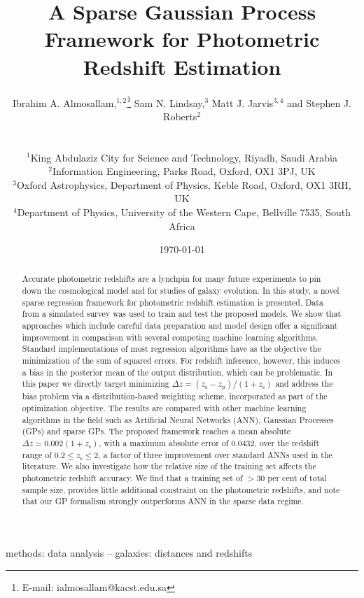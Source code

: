 \documentclass[useAMS,usenatbib,fleqn]{mn2e}
\title[A Sparse GP Framework for Photometric Redshift]{A Sparse Gaussian Process Framework for Photometric Redshift Estimation}
\author[Almosallam et al.]
{\parbox{\textwidth}{Ibrahim A. Almosallam,$^{1,2}$\thanks{E-mail: ialmosallam@kacst.edu.sa} Sam N. Lindsay,$^{3}$ Matt J. Jarvis$^{3,4}$ and Stephen J. Roberts$^{2}$
}
\vspace{0.4cm}\\
\parbox{\textwidth}{
$^1$King Abdulaziz City for Science and Technology, Riyadh, Saudi Arabia\\
$^2$Information Engineering, Parks Road, Oxford, OX1 3PJ, UK\\
$^3$Oxford Astrophysics, Department of Physics, Keble Road, Oxford, OX1 3RH, UK\\
$^4$Department of Physics, University of the Western Cape, Bellville 7535, South Africa\\
}}
\begin{document}
\date{\today}

\pagerange{\pageref{firstpage}--\pageref{lastpage}} 

\maketitle

\label{firstpage}

\begin{abstract}
Accurate photometric redshifts are a lynchpin for many future experiments to pin down the cosmological model and for studies of galaxy evolution. In this study, a novel sparse regression framework for photometric redshift estimation is presented. Data from a simulated survey was used to train and test the proposed models. We show that approaches which include careful data preparation and model design offer a significant improvement in comparison with several competing machine learning algorithms. Standard implementations of most regression algorithms have as the objective the minimization of the sum of squared errors. For redshift inference, however, this induces a bias in the posterior mean of the output distribution, which can be problematic. In this paper we directly target minimizing $\Delta z = (z_\textrm{s} - z_\textrm{p})/(1+z_\textrm{s})$ and address the bias problem via a distribution-based weighting scheme, incorporated as part of the optimization objective. The results are compared with other machine learning algorithms in the field such as Artificial Neural Networks (ANN), Gaussian Processes (GPs) and sparse GPs. The proposed framework reaches a mean absolute $\Delta z = 0.002(1+z_\textrm{s})$, with a maximum absolute error of 0.0432, over the redshift range of $0.2 \le z_\textrm{s} \le 2$, a factor of three improvement over standard ANNs used in the literature. We also investigate how the relative  size of the training set affects the photometric redshift accuracy. We find that a training set of $>$30 per cent of total sample size, provides little additional constraint on the photometric redshifts, and note that our GP formalism strongly outperforms ANN in the sparse data regime.
\end{abstract}

\begin{keywords}
methods: data analysis -- galaxies: distances and redshifts
\end{keywords}
\end{document}
